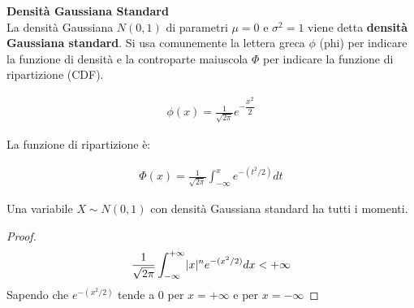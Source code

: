 \FloatBarrier

\begin{defn}
    \textbf{Densità Gaussiana Standard} \\
    La densità Gaussiana $N(0,1)$ di
    parametri $\mu = 0$ e $\sigma^2 = 1$ viene detta \textbf{densità Gaussiana
    standard}. Si usa comunemente la lettera greca $\phi$ (phi) per indicare la
    funzione di densità e la controparte maiuscola $\Phi$ per indicare la funzione di ripartizione (CDF).

    \begin{equation*}
        \begin{aligned}
            \phi(x) = \frac{1}{\sqrt{2 \pi}} e^{-\dfrac{x^2}{2}}
        \end{aligned}
    \end{equation*}

    La funzione di ripartizione è:

    \begin{equation*}
        \begin{aligned}
            \Phi(x) = \frac{1}{\sqrt{2 \pi}} \int_{-\infty}^{x} e^{-(t^2/2)} dt
        \end{aligned}
    \end{equation*}

    \begin{prop}
        Una variabile $X \sim N(0,1)$ con densità Gaussiana standard ha tutti i
        momenti.
    \end{prop}

    \begin{proof}
        \begin{equation*}
            \begin{aligned}
                \frac{1}{\sqrt{2 \pi}} \int_{-\infty}^{+\infty} \lvert x\rvert^n e^{-(x^2/2)} dx < +\infty
            \end{aligned}
        \end{equation*}
        Sapendo che $e^{-(x^2/2)}$ tende a 0 per $x = +\infty$ e per $x = -\infty$
    \end{proof}
\end{defn}

